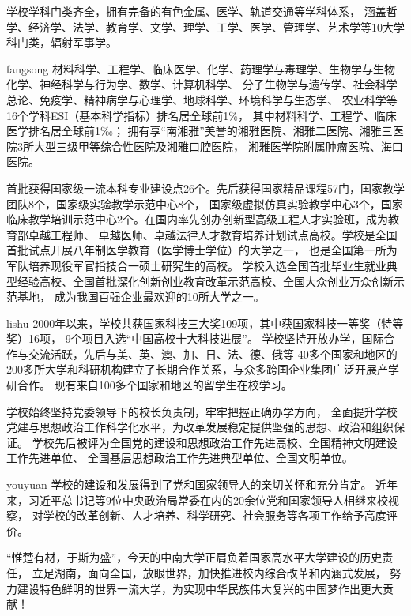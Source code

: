  {\kaishu 学校学科门类齐全，拥有完备的有色金属、医学、轨道交通等学科体系，
  涵盖哲学、经济学、法学、教育学、文学、理学、工学、医学、管理学、艺术学等10大学科门类，辐射军事学。
 }

 {\ifcsname fangsong\endcsname\fangsong\else[无 \cs{fangsong} 字体。]\fi
  材料科学、工程学、临床医学、化学、药理学与毒理学、生物学与生物化学、神经科学与行为学、数学、计算机科学、
  分子生物学与遗传学、社会科学总论、免疫学、精神病学与心理学、地球科学、环境科学与生态学、
  农业科学等16个学科ESI（基本科学指标）排名居全球前1\%，
  其中材料科学、工程学、临床医学排名居全球前1‰；
  拥有享“南湘雅”美誉的湘雅医院、湘雅二医院、湘雅三医院3所大型三级甲等综合性医院及湘雅口腔医院，
  湘雅医学院附属肿瘤医院、海口医院。

  首批获得国家级一流本科专业建设点26个。先后获得国家精品课程57门，国家教学团队8个，国家级实验教学示范中心8个，
  国家级虚拟仿真实验教学中心3个，国家临床教学培训示范中心2个。在国内率先创办创新型高级工程人才实验班，成为教育部卓越工程师、
  卓越医师、卓越法律人才教育培养计划试点高校。学校是全国首批试点开展八年制医学教育（医学博士学位）的大学之一，
  也是全国第一所为军队培养现役军官指技合一硕士研究生的高校。
  学校入选全国首批毕业生就业典型经验高校、全国首批深化创新创业教育改革示范高校、全国大众创业万众创新示范基地，
  成为我国百强企业最欢迎的10所大学之一。
 }

 {\ifcsname lishu\endcsname\lishu\else[无 \cs{lishu} 字体。]\fi
  2000年以来，学校共获国家科技三大奖109项，其中获国家科技一等奖（特等奖）16项，
  9个项目入选“中国高校十大科技进展”。
  学校坚持开放办学，国际合作与交流活跃，先后与美、英、澳、加、日、法、德、俄等
  40多个国家和地区的200多所大学和科研机构建立了长期合作关系，与众多跨国企业集团广泛开展产学研合作。
  现有来自100多个国家和地区的留学生在校学习。

  学校始终坚持党委领导下的校长负责制，牢牢把握正确办学方向，
  全面提升学校党建与思想政治工作科学化水平，为改革发展稳定提供坚强的思想、政治和组织保证。
  学校先后被评为全国党的建设和思想政治工作先进高校、全国精神文明建设工作先进单位、
  全国基层思想政治工作先进典型单位、全国文明单位。
 }

 {\ifcsname youyuan\endcsname\youyuan\else[无 \cs{youyuan} 字体。]\fi
  学校的建设和发展得到了党和国家领导人的亲切关怀和充分肯定。
  近年来，习近平总书记等9位中央政治局常委在内的20余位党和国家领导人相继来校视察，
  对学校的改革创新、人才培养、科学研究、社会服务等各项工作给予高度评价。

  “惟楚有材，于斯为盛”，今天的中南大学正肩负着国家高水平大学建设的历史责任，
  立足湖南，面向全国，放眼世界，加快推进校内综合改革和内涵式发展，
  努力建设特色鲜明的世界一流大学，为实现中华民族伟大复兴的中国梦作出更大贡献！}
